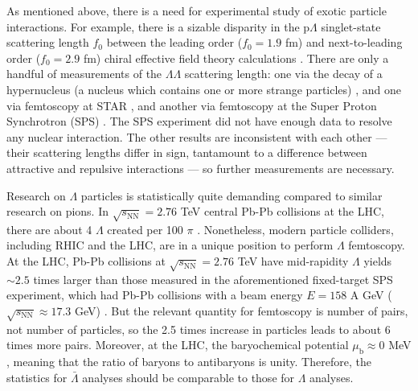 As mentioned above, there is a need for experimental study of exotic particle interactions.
For example, there is a sizable disparity in the p$\Lambda$ singlet-state scattering length $f_0$ between the leading order ($f_0 = 1.9$ fm) and next-to-leading order ($f_0 = 2.9$ fm) chiral effective field theory calculations \cite{Haidenbauer:2013oca}.
There are only a handful of measurements of the $\Lambda\Lambda$ scattering length: one via the decay of a hypernucleus (a nucleus which contains one or more strange particles) \cite{Takahashi:2001nm,Filikhin:2002wm,Hiyama:2002yj}, and one via femtoscopy at STAR \cite{Adamczyk:2014vca}, and another via femtoscopy at the Super Proton Synchrotron (SPS) \cite{Andersen:1999gq}.
The SPS experiment did not have enough data to resolve any nuclear interaction.
The other results are inconsistent with each other --- their scattering lengths differ in sign, tantamount to a difference between attractive and repulsive interactions --- so further measurements are necessary.

Research on $\Lambda$ particles is statistically quite demanding compared to similar research on pions.
In $\sqrt{s_{\mathrm{NN}}}=2.76$ TeV central Pb-Pb collisions at the LHC, there are about 4 $\Lambda$ created per 100 $\pi$ \cite{Zhang:2013fta}.
Nonetheless, modern particle colliders, including RHIC and the LHC, are in a unique position to perform $\Lambda$ femtoscopy.
At the LHC, Pb-Pb collisions at $\sqrt{s_{\mathrm{NN}}}=2.76$ TeV have mid-rapidity $\Lambda$ yields $\sim 2.5$ times larger than those measured in the aforementioned fixed-target SPS experiment, which had Pb-Pb collisions with a beam energy $E = 158$ A GeV ($\sqrt{s_{\mathrm{NN}}} \approx 17.3$ GeV)  \cite{Abelev:2013xaa,Alt:2008qm}.
But the relevant quantity for femtoscopy is number of pairs, not number of particles, so the 2.5 times increase in particles leads to about 6 times more pairs. 
Moreover, at the LHC, the baryochemical potential $\mu_\mathrm{b} \approx 0$ MeV \cite{Stachel:2013zma}, meaning that the ratio of baryons to antibaryons is unity.
Therefore, the statistics for $\bar{\Lambda}$ analyses should be comparable to those for $\Lambda$ analyses.



